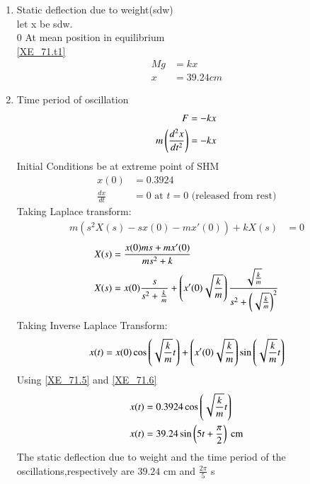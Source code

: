 \documentclass[journal,12pt,twocolumn]{IEEEtran}
\theoremstyle{remark}
\begin{document}
\begin{enumerate}
    \item Static deflection due to weight(sdw)\\
    let x be sdw.\\0
    At mean position in equilibrium\\
    \ref{XE_71.t1}
    \begin{align}
        Mg&=kx\\
        x&=39.24cm
    \end{align}
     \item Time period of oscillation\\
     \begin{align}
           F&=-kx\\
           m\left(\frac{d^2x}{dt^2}\right)&=-kx
     \end{align}
      Initial Conditions be at extreme  point of SHM
      \begin{align}
       x(0)&=0.3924 \label{XE_71.5}\\
       \frac{dx}{dt}&=0 \text{ at } t=0 \text{ (released from rest)} \label{XE_71.6}
        \end{align} 
     Taking Laplace transform:
     \begin{align}
     m(s^2X(s)-sx(0)-mx'(0))+kX(s)&=0
     \end{align}
     \begin{align}
      X(s) &= \frac{x(0)ms+mx'(0)}{ms^2 + k}\\
      X(s)&=x(0)\frac{s}{s^2+\frac{k}{m}}+\left(x'(0)\sqrt{\frac{k}{m}}\right)\frac{\sqrt{\frac{k}{m}}}{s^2+\left(\sqrt{\frac{k}{m}}\right)^2}
      \end{align}
     Taking Inverse Laplace Transform:\\
     \begin{align}
     x(t)&=x(0)\cos\left(\sqrt{\frac{k}{m}}t\right)+\left(x'(0)\sqrt{\frac{k}{m}}\right)\sin \left(\sqrt{\frac{k}{m}}t\right)\\
     \end{align}
     Using \ref{XE_71.5} and \ref{XE_71.6} 
     \begin{align}
      x(t) &= 0.3924 \cos\left(\sqrt{\frac{k}{m}}t\right)\\
      x(t)&=39.24 \sin\left(5t+\frac{\pi}{2}\right) \text{ cm}
     \end{align}
    The static deflection due to weight and the time period of the oscillations,respectively are $39.24$ cm and $\frac{2\pi}{5}$ s
\end{enumerate}
\end{document}
